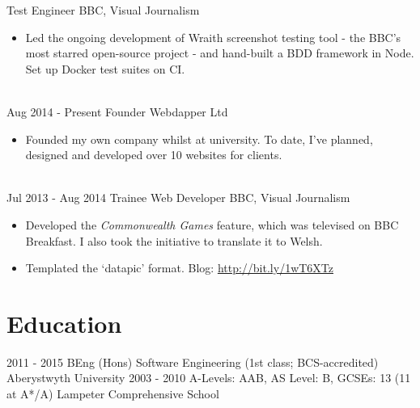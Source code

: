 \documentclass[letterpaper]{twentysecondcv} %
\begin{document}
\begin{twenty}
        {Test Engineer}
        {BBC, Visual Journalism}
        {}
        {
        {\begin{itemize}
        \item Led the ongoing development of Wraith screenshot testing tool - the BBC's most starred open-source project - and hand-built a BDD framework in Node. Set up Docker test suites on CI.
    \end{itemize}}
        }
     \\
     \twentyitem
   		{Aug 2014 -}
		{Present}
        {Founder}
        {Webdapper Ltd}
        {}
        {
        \begin{itemize}
        \item Founded my own company whilst at university. To date, I've planned, designed and developed over 10 websites for clients.
    \end{itemize}
    	}
    \\
    \twentyitem
   		{Jul 2013 -}
		{Aug 2014}
        {Trainee Web Developer}
        {BBC, Visual Journalism}
        {}
        {
        {\begin{itemize}
        \item Developed the \emph{Commonwealth Games} feature, which was televised on BBC Breakfast. I also took the initiative to translate it to Welsh.
        \item Templated the ‘datapic’ format. Blog: \url{http://bit.ly/1wT6XTz}
    \end{itemize}}
        }

\end{twenty}

\section{Education}

\begin{twenty} %
	\twentyitem
    	{2011 - 2015}
        {}
        {BEng (Hons) Software Engineering \textnormal{(1st class; BCS-accredited)}}
        {}
        {Aberystwyth University}
        {}
	\twentyitem
    	{2003 - 2010}
		{}
        {A-Levels: \textnormal{AAB}, AS Level: \textnormal{B}, GCSEs: \textnormal{13 (11 at A*/A)}
        }
        {}
        {Lampeter Comprehensive School}
        {}
\end{twenty}
\end{document}
